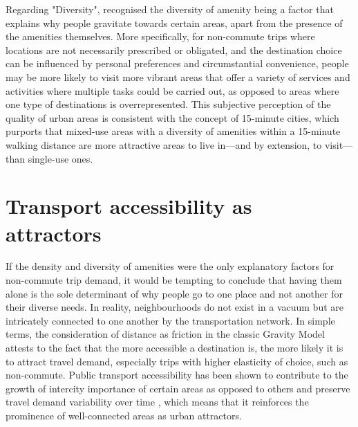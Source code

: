 Regarding "Diversity", \citet{cerveroTravelDemand3Ds1997} recognised the diversity of amenity being a factor that explains why people gravitate towards certain areas, apart from the presence of the amenities themselves. More specifically, for non-commute trips where locations are not necessarily prescribed or obligated, and the destination choice can be influenced by personal preferences and circumstantial convenience, people may be more likely to visit more vibrant areas that offer a variety of services and activities where multiple tasks could be carried out, as opposed to areas where one type of destinations is overrepresented. This subjective perception of the quality of urban areas is consistent with the concept of 15-minute cities, which purports that mixed-use areas with a diversity of amenities within a 15-minute walking distance are more attractive areas to live in---and by extension, to visit---than single-use ones. \citep{khavarian-garmsirGardenCity15Minute2023}

\section{Transport accessibility as attractors}

If the density and diversity of amenities were the only explanatory factors for non-commute trip demand, it would be tempting to conclude that having them alone is the sole determinant of why people go to one place and not another for their diverse needs. In reality, neighbourhoods do not exist in a vacuum but are intricately connected to one another by the transportation network. In simple terms, the consideration of distance as friction in the classic Gravity Model attests to the fact that the more accessible a destination is, the more likely it is to attract travel demand, especially trips with higher elasticity of choice, such as non-commute. Public transport accessibility has been shown to contribute to the growth of intercity importance of certain areas as opposed to others and preserve travel demand variability over time \citep{zhongMeasuringVariabilityMobility2015}, which means that it reinforces the prominence of well-connected areas as urban attractors. 

